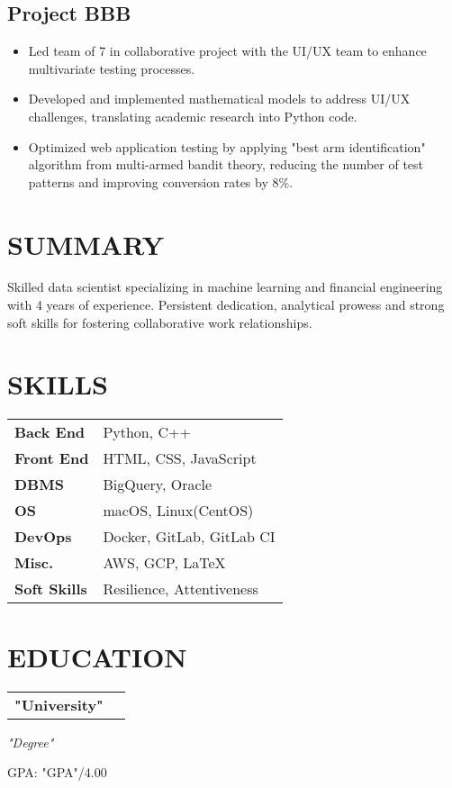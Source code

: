 \documentclass[11pt,a4paper]{moderncv}
\newcommand*{\projectentry}[2][1.5mm]{
    \subsection{#2} \vspace{-1.5mm}
    \par\addvspace{#1}
}
\newcommand*{\educationentry}[4][0.5mm]{
    \begin{tabularx}{\textwidth}{LR}
        {\bfseries #3} & {\bfseries #4} \\
    \end{tabularx}
    {\itshape #2}
    \par\addvspace{#1}
}
\begin{document}
\begin{minipage}[t]{0.62\textwidth}
\projectentry{Project BBB}

\begin{itemize}
    \item Led team of 7 in collaborative project with the UI/UX team to enhance multivariate testing processes.
    \item Developed and implemented mathematical models to address UI/UX challenges, translating academic research into Python code.
    \item Optimized web application testing by applying "best arm identification" algorithm from multi-armed bandit theory, reducing the number of test patterns and improving conversion rates by 8\%.
\end{itemize}


\end{minipage}
\hfill
\begin{minipage}[t]{0.35\textwidth}
\section{SUMMARY}
Skilled data scientist specializing in machine learning and financial engineering with 4 years of experience. Persistent dedication, analytical prowess and strong soft skills for fostering collaborative work relationships.

\section{SKILLS}
\begin{tabularx}{\textwidth}{>{\bfseries}l@{\hskip 3.5mm}L}
Back End & Python, C++ \\
Front End & HTML, CSS, JavaScript \\
DBMS & BigQuery, Oracle \\
OS & macOS, Linux(CentOS) \\
DevOps & Docker, GitLab, GitLab CI \\
Misc. & AWS, GCP, \LaTeX \\
Soft Skills & Resilience, Attentiveness
\end{tabularx}

\section{EDUCATION}
\educationentry{"Degree"}{"University"}{}
GPA: "GPA"/4.00

\end{minipage}
\end{document}

